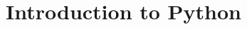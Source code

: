 \documentclass[10pt,oneside,bigheadings,tablecaptionabove]{scrbook}
\begin{document}
\chapter{Introduction to Python}


% 
% 
% 
% 
% 


% 

% 

% 

% 

% 

%


%
%
% 
% 
\end{document}
